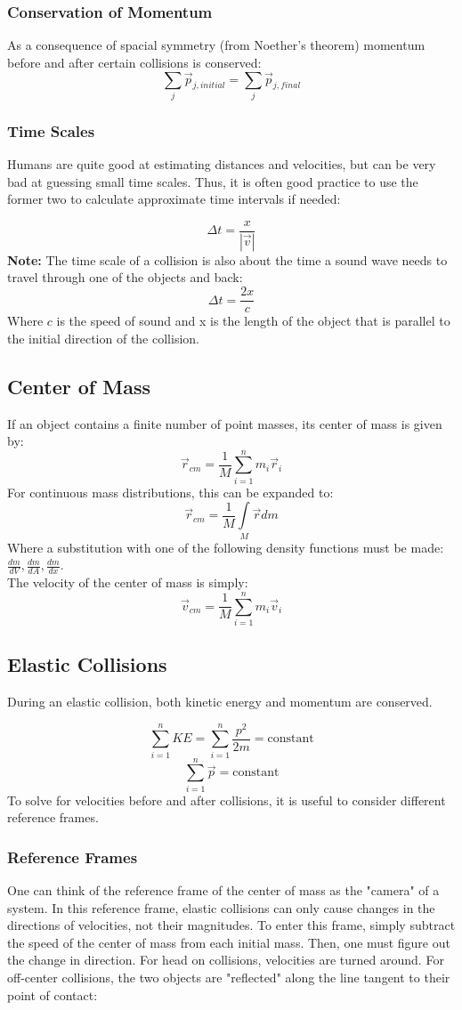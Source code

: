 \documentclass{article}
\begin{document}
\subsubsection{Conservation of Momentum} As a consequence of spacial symmetry (from Noether's theorem) momentum before and after certain collisions is conserved:
$$\sum \limits_{j} \vec{p}_{j,initial}=\sum \limits_j \vec{p}_{j,final}$$
\subsubsection{Time Scales}Humans are quite good at estimating distances and velocities, but can be very bad at guessing small time scales. Thus, it is often good practice to use the former two to calculate approximate time intervals if needed:

$$\Delta t= \frac{x}{|\vec{v}|}$$
\textbf{Note:} The time scale of a collision is also about the time a sound wave needs to travel through one of the objects and back:
$$\Delta t = \frac{2x}{c}$$
Where $c$ is the speed of sound and x is the length of the object that is parallel to the initial direction of the collision.
\subsection{Center of Mass}If an object contains a finite number of point masses, its center of mass is given by:
$$\vec{r}_{cm}=\frac{1}{M}\sum \limits_{i=1}^{n}m_i \vec{r}_i$$
For continuous mass distributions, this can be expanded to:
$$\vec{r}_{cm}=\frac{1}{M} \int \limits_M \vec{r} dm$$
Where a substitution with one of the following density functions must be made: $\frac{dm}{dV}, \frac{dm}{dA}, \frac{dm}{dx}.$
\\
The velocity of the center of mass is simply:
$$\vec{v}_{cm}=\frac{1}{M}\sum \limits_{i=1}^{n}m_i \vec{v}_i$$

\subsection{Elastic Collisions}
During an elastic collision, both kinetic energy and momentum are conserved.

$$\sum \limits^{n}_{i=1}KE=\sum \limits^{n}_{i=1}\frac{p^2}{2m}=\text{constant}$$
$$\sum \limits^{n}_{i=1}\vec{p}=\text{constant}$$
To solve for velocities before and after collisions, it is useful to consider different reference frames.
\subsubsection{Reference Frames}
One can think of the reference frame of the center of mass as the "camera" of a system. In this reference frame, elastic collisions can only cause changes in the directions of velocities, not their magnitudes. To enter this frame, simply subtract the speed of the center of mass from each initial mass. Then, one must figure out the change in direction. For head on collisions, velocities are turned around. For off-center collisions, the two objects are "reflected" along the line tangent to their point of contact:
\end{document}
